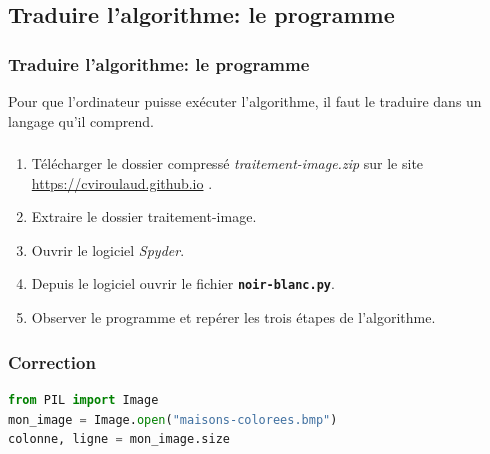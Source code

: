 \documentclass[svgnames,11pt]{beamer}
\begin{document}
\subsection{Traduire l'algorithme: le programme}
\begin{frame}
    \frametitle{Traduire l'algorithme: le programme}

    \begin{aretenir}[]
        Pour que l'ordinateur puisse exécuter l'algorithme, il faut le traduire dans un langage qu'il comprend.
    \end{aretenir}

\end{frame}
\begin{frame}
    \frametitle{}

    \begin{activite}
        \begin{enumerate}
            \item Télécharger le dossier compressé \emph{traitement-image.zip} sur le site \url{https://cviroulaud.github.io} .
            \item Extraire le dossier traitement-image.
            \item Ouvrir le logiciel \emph{Spyder}.
            \item Depuis le logiciel ouvrir le fichier \texttt{\textbf{noir-blanc.py}}.
            \item Observer le programme et repérer les trois étapes de l'algorithme.
        \end{enumerate}
    \end{activite}

\end{frame}
\begin{frame}[fragile]
    \frametitle{Correction}

    \begin{center}
        \begin{lstlisting}[language=Python , basicstyle=\ttfamily\small, xleftmargin=1em, xrightmargin=1em]
from PIL import Image
mon_image = Image.open("maisons-colorees.bmp")
colonne, ligne = mon_image.size
\end{lstlisting}
        \label{CODE}
    \end{center}

\end{frame}
\end{document}
